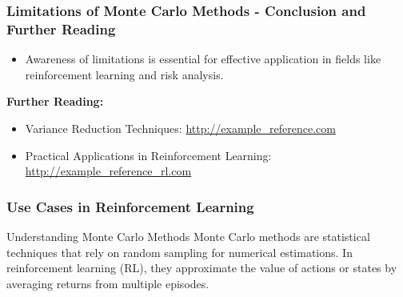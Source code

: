 \documentclass[aspectratio=169]{beamer}
\begin{document}
\begin{frame}[fragile]
    \frametitle{Limitations of Monte Carlo Methods - Conclusion and Further Reading}
    \begin{itemize}
        \item Awareness of limitations is essential for effective application in fields like reinforcement learning and risk analysis.
    \end{itemize}
    \textbf{Further Reading:}
    \begin{itemize}
        \item Variance Reduction Techniques: \url{http://example_reference.com}  
        \item Practical Applications in Reinforcement Learning: \url{http://example_reference_rl.com}
    \end{itemize}
\end{frame}

\begin{frame}[fragile]
    \frametitle{Use Cases in Reinforcement Learning}
    \begin{block}{Understanding Monte Carlo Methods}
        Monte Carlo methods are statistical techniques that rely on random sampling for numerical estimations. 
        In reinforcement learning (RL), they approximate the value of actions or states by averaging returns from multiple episodes.
    \end{block}
\end{frame}
\end{document}
